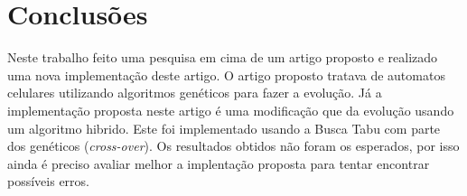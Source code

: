 \documentclass[12pt]{article}
\begin{document}
\section{Conclusões}

Neste trabalho feito uma pesquisa em cima de um artigo proposto e realizado 
uma nova implementação deste artigo. O artigo proposto tratava de automatos
celulares utilizando algoritmos genéticos para fazer a evolução. Já a
implementação proposta neste artigo é uma modificação que da evolução usando
um algoritmo hibrido. Este foi implementado usando a Busca Tabu com parte dos
genéticos (\textit{cross-over}). Os resultados obtidos não foram os esperados,
por isso ainda é preciso avaliar melhor a implentação proposta para tentar
encontrar possíveis erros.




\end{document}
